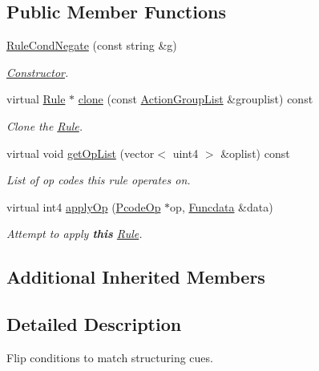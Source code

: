 \subsection*{Public Member Functions}
\begin{DoxyCompactItemize}
\item 
\mbox{\hyperlink{class_rule_cond_negate_a1c84b28ea18d19694633f99915dba439}{Rule\+Cond\+Negate}} (const string \&g)
\begin{DoxyCompactList}\small\item\em \mbox{\hyperlink{class_constructor}{Constructor}}. \end{DoxyCompactList}\item 
virtual \mbox{\hyperlink{class_rule}{Rule}} $\ast$ \mbox{\hyperlink{class_rule_cond_negate_aebb1cb7788a492ef797489ea261a81a4}{clone}} (const \mbox{\hyperlink{class_action_group_list}{Action\+Group\+List}} \&grouplist) const
\begin{DoxyCompactList}\small\item\em Clone the \mbox{\hyperlink{class_rule}{Rule}}. \end{DoxyCompactList}\item 
virtual void \mbox{\hyperlink{class_rule_cond_negate_ac5ff9f8937c4667aebd7178f8231a64c}{get\+Op\+List}} (vector$<$ uint4 $>$ \&oplist) const
\begin{DoxyCompactList}\small\item\em List of op codes this rule operates on. \end{DoxyCompactList}\item 
virtual int4 \mbox{\hyperlink{class_rule_cond_negate_a085f7cbc001d8d211be810d8578f4b7a}{apply\+Op}} (\mbox{\hyperlink{class_pcode_op}{Pcode\+Op}} $\ast$op, \mbox{\hyperlink{class_funcdata}{Funcdata}} \&data)
\begin{DoxyCompactList}\small\item\em Attempt to apply {\bfseries{this}} \mbox{\hyperlink{class_rule}{Rule}}. \end{DoxyCompactList}\end{DoxyCompactItemize}
\subsection*{Additional Inherited Members}


\subsection{Detailed Description}
Flip conditions to match structuring cues. 

